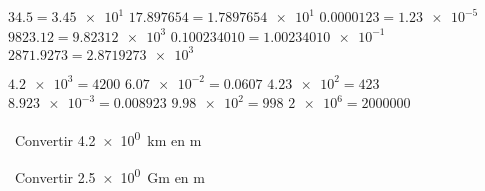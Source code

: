 \documentclass[../Cours.tex]{subfiles}
\begin{document}
\clearpage
\CORRECTIONS
\begin{questions}
    \vspace{-1.5em}
    \begin{multicols}{2}
        \question $\num{34.5} = \num{3.45e1}$
        \question $\num{17.897654} = \num{1.7897654e1}$
        \question $\num{0.0000123} = \num{1.23e-5}$
        \question $\num{9823.12} = \num{9.82312e3}$
        \question $\num{0.100234010} = \num{1.00234010e-1}$
        \question $\num{2871.9273} = \num{2.8719273e3}$
    \end{multicols}
    
    \vspace{-1.5em}
    \begin{multicols}{2}
        \question  $\num{4.2e3} = \num{4200}$
        \question  $\num{6.07e-2} = \num{0.0607}$
        \question  $\num{4.23e2} = \num{423}$
        \question  $\num{8.923e-3} = \num{0.008923}$
        \question  $\num{9.98e2} = \num{998}$
        \question  $\num{2e6} = \num{2000000}$
    \end{multicols}
    
        \question~Convertir \qty{4.2e0}{\kilo\metre} en \unit{\metre}\\
            \renewcommand{\arraystretch}{1.65}
            \renewcommand{\arraystretch}{1}
            
        \question~Convertir \qty{2.5e0}{\giga\metre} en \unit{\metre}\\
            \renewcommand{\arraystretch}{1.65}
            \renewcommand{\arraystretch}{1}
            

\end{questions}
\end{document}
